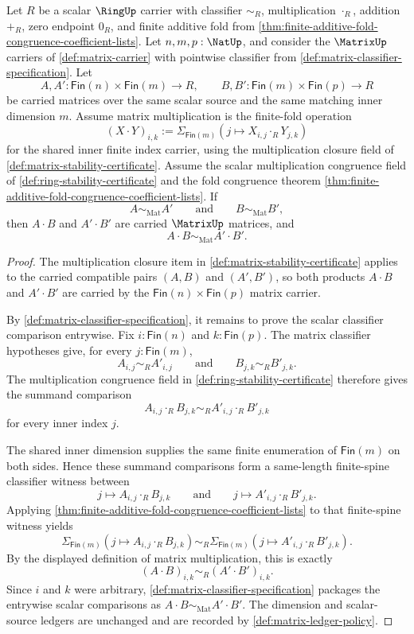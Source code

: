 \begin{theorem}
\label{thm:matrix-multiplication-classifier-congruence}
Let $R$ be a scalar $\RingUp$ carrier with classifier $\sim_R$, multiplication $\cdot_R$, addition $+_R$, zero endpoint $0_R$, and finite additive fold from \autoref{thm:finite-additive-fold-congruence-coefficient-lists}. Let $n,m,p:\NatUp$, and consider the $\MatrixUp$ carriers of \autoref{def:matrix-carrier} with pointwise classifier from \autoref{def:matrix-classifier-specification}. Let
$$
A,A':\mathsf{Fin}(n)\times\mathsf{Fin}(m)\to R,
\qquad
B,B':\mathsf{Fin}(m)\times\mathsf{Fin}(p)\to R
$$
be carried matrices over the same scalar source and the same matching inner dimension $m$. Assume matrix multiplication is the finite-fold operation
$$
(X\cdot Y)_{i,k}:=\Sigma_{\mathsf{Fin}(m)}(j\mapsto X_{i,j}\cdot_RY_{j,k})
$$
for the shared inner finite index carrier, using the multiplication closure field of \autoref{def:matrix-stability-certificate}. Assume the scalar multiplication congruence field of \autoref{def:ring-stability-certificate} and the fold congruence theorem \autoref{thm:finite-additive-fold-congruence-coefficient-lists}. If
$$
A\sim_{\mathrm{Mat}}A'
\qquad\text{and}\qquad
B\sim_{\mathrm{Mat}}B',
$$
then $A\cdot B$ and $A'\cdot B'$ are carried $\MatrixUp$ matrices, and
$$
A\cdot B\sim_{\mathrm{Mat}}A'\cdot B'.
$$
\end{theorem}
\begin{proof}
The multiplication closure item in \autoref{def:matrix-stability-certificate} applies to the carried compatible pairs $(A,B)$ and $(A',B')$, so both products $A\cdot B$ and $A'\cdot B'$ are carried by the $\mathsf{Fin}(n)\times\mathsf{Fin}(p)$ matrix carrier.

By \autoref{def:matrix-classifier-specification}, it remains to prove the scalar classifier comparison entrywise. Fix $i:\mathsf{Fin}(n)$ and $k:\mathsf{Fin}(p)$. The matrix classifier hypotheses give, for every $j:\mathsf{Fin}(m)$,
$$
A_{i,j}\sim_R A'_{i,j}
\qquad\text{and}\qquad
B_{j,k}\sim_R B'_{j,k}.
$$
The multiplication congruence field in \autoref{def:ring-stability-certificate} therefore gives the summand comparison
$$
A_{i,j}\cdot_R B_{j,k}
\sim_R
A'_{i,j}\cdot_R B'_{j,k}
$$
for every inner index $j$.

The shared inner dimension supplies the same finite enumeration of $\mathsf{Fin}(m)$ on both sides. Hence these summand comparisons form a same-length finite-spine classifier witness between
$$
j\mapsto A_{i,j}\cdot_R B_{j,k}
\qquad\text{and}\qquad
j\mapsto A'_{i,j}\cdot_R B'_{j,k}.
$$
Applying \autoref{thm:finite-additive-fold-congruence-coefficient-lists} to that finite-spine witness yields
$$
\Sigma_{\mathsf{Fin}(m)}(j\mapsto A_{i,j}\cdot_R B_{j,k})
\sim_R
\Sigma_{\mathsf{Fin}(m)}(j\mapsto A'_{i,j}\cdot_R B'_{j,k}).
$$
By the displayed definition of matrix multiplication, this is exactly
$$
(A\cdot B)_{i,k}\sim_R(A'\cdot B')_{i,k}.
$$
Since $i$ and $k$ were arbitrary, \autoref{def:matrix-classifier-specification} packages the entrywise scalar comparisons as $A\cdot B\sim_{\mathrm{Mat}}A'\cdot B'$. The dimension and scalar-source ledgers are unchanged and are recorded by \autoref{def:matrix-ledger-policy}.
\end{proof}

